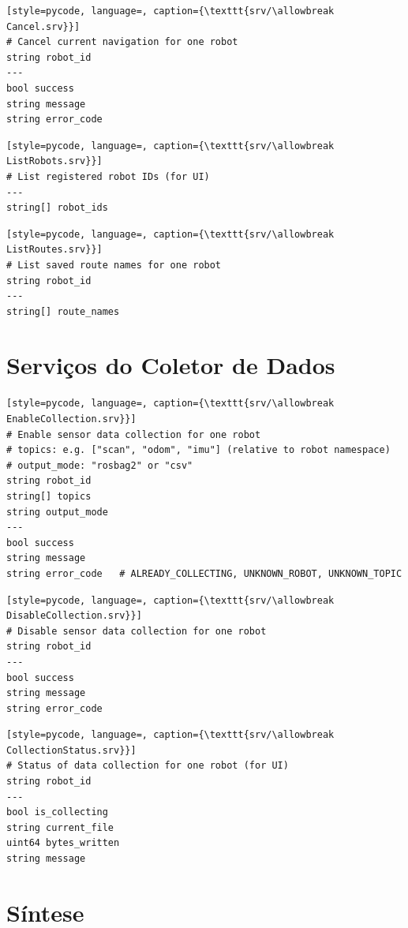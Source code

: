 \begin{lstlisting}[style=pycode, language=, caption={\texttt{srv/\allowbreak Cancel.srv}}]
# Cancel current navigation for one robot
string robot_id
---
bool success
string message
string error_code
\end{lstlisting}

\begin{lstlisting}[style=pycode, language=, caption={\texttt{srv/\allowbreak ListRobots.srv}}]
# List registered robot IDs (for UI)
---
string[] robot_ids
\end{lstlisting}

\begin{lstlisting}[style=pycode, language=, caption={\texttt{srv/\allowbreak ListRoutes.srv}}]
# List saved route names for one robot
string robot_id
---
string[] route_names
\end{lstlisting}

\section{Serviços do Coletor de Dados}

\begin{lstlisting}[style=pycode, language=, caption={\texttt{srv/\allowbreak EnableCollection.srv}}]
# Enable sensor data collection for one robot
# topics: e.g. ["scan", "odom", "imu"] (relative to robot namespace)
# output_mode: "rosbag2" or "csv"
string robot_id
string[] topics
string output_mode
---
bool success
string message
string error_code   # ALREADY_COLLECTING, UNKNOWN_ROBOT, UNKNOWN_TOPIC
\end{lstlisting}

\begin{lstlisting}[style=pycode, language=, caption={\texttt{srv/\allowbreak DisableCollection.srv}}]
# Disable sensor data collection for one robot
string robot_id
---
bool success
string message
string error_code
\end{lstlisting}

\begin{lstlisting}[style=pycode, language=, caption={\texttt{srv/\allowbreak CollectionStatus.srv}}]
# Status of data collection for one robot (for UI)
string robot_id
---
bool is_collecting
string current_file
uint64 bytes_written
string message
\end{lstlisting}

\section{Síntese}

